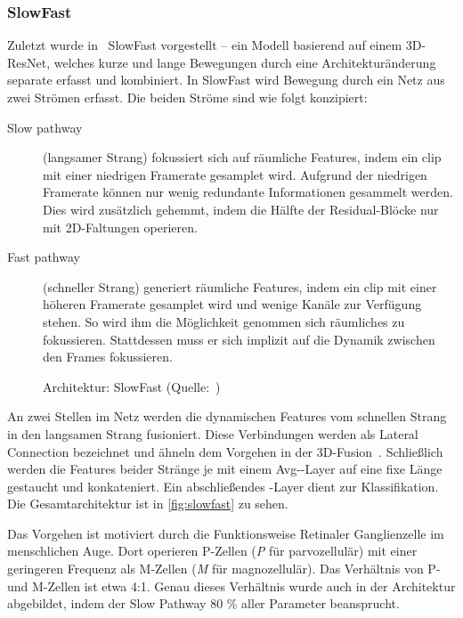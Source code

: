 \subsubsection*{SlowFast}

Zuletzt wurde in~\cite{Feichtenhofer18} SlowFast vorgestellt -- ein Modell basierend auf einem 3D-ResNet, welches kurze und lange Bewegungen durch eine Architekturänderung separate erfasst und kombiniert.
In SlowFast wird Bewegung durch ein Netz aus zwei Strömen erfasst.
Die beiden Ströme sind wie folgt konzipiert:

\begin{description}
    \item[Slow pathway]
    (langsamer Strang) fokussiert sich auf räumliche Features, indem ein \gls{clip} mit einer niedrigen Framerate gesamplet wird.
    Aufgrund der niedrigen Framerate können nur wenig redundante Informationen gesammelt werden.
    Dies wird zusätzlich gehemmt, indem die Hälfte der Residual-Blöcke nur mit 2D-Faltungen operieren.
    \item[Fast pathway]
    (schneller Strang) generiert räumliche Features, indem ein \gls{clip} mit einer höheren Framerate gesamplet wird und wenige Kanäle zur Verfügung stehen.
    So wird ihm die Möglichkeit genommen sich räumliches zu fokussieren.
    Stattdessen muss er sich implizit auf die Dynamik zwischen den Frames fokussieren.
\end{description}

\begin{figure}[h!]
    \centering
    \caption{Architektur: SlowFast (Quelle:~\cite{Feichtenhofer18})}
    \label{fig:slowfast}
\end{figure}

An zwei Stellen im Netz werden die dynamischen Features vom schnellen Strang in den langsamen Strang fusioniert.
Diese Verbindungen werden als Lateral Connection bezeichnet und ähneln dem Vorgehen in der 3D-Fusion~\cite{Feichtenhofer16}.
Schließlich werden die Features beider Stränge je mit einem Avg-\pool-Layer auf eine fixe Länge gestaucht und konkateniert.
Ein abschließendes \fc-Layer dient zur Klassifikation.
Die Gesamtarchitektur ist in \autoref{fig:slowfast} zu sehen.

Das Vorgehen ist motiviert durch die Funktionsweise Retinaler Ganglienzelle im menschlichen Auge.
Dort operieren P-Zellen (\emph{P} für parvozellulär) mit einer geringeren Frequenz als M-Zellen (\emph{M} für magnozellulär).
Das Verhältnis von P- und M-Zellen ist etwa 4:1.
Genau dieses Verhältnis wurde auch in der Architektur abgebildet, indem der Slow Pathway 80 \% aller Parameter beansprucht.

